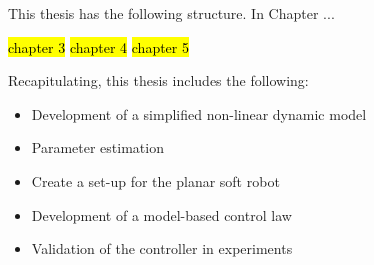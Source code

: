 This thesis has the following structure. In Chapter ...

\hl{chapter 3}
\hl{chapter 4}
\hl{chapter 5}


Recapitulating, this thesis includes the following:


\begin{itemize}
    \item Development of a simplified non-linear dynamic model
    \item Parameter estimation
    \item Create a set-up for the planar soft robot 
    \item Development of a model-based control law
    \item Validation of the controller in experiments
\end{itemize}